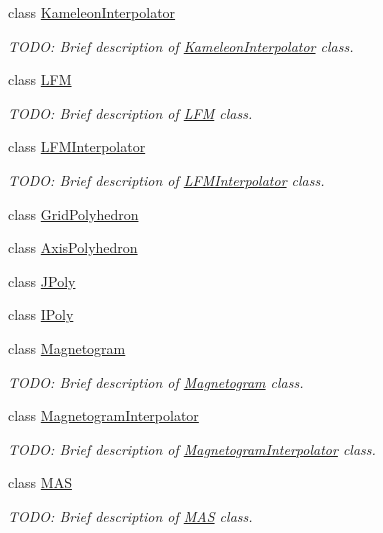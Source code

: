\begin{DoxyCompactItemize}
class \hyperlink{classccmc_1_1_kameleon_interpolator}{Kameleon\-Interpolator}
\begin{DoxyCompactList}\small\item\em T\-O\-D\-O\-: Brief description of \hyperlink{classccmc_1_1_kameleon_interpolator}{Kameleon\-Interpolator} class. \end{DoxyCompactList}\item 
class \hyperlink{classccmc_1_1_l_f_m}{L\-F\-M}
\begin{DoxyCompactList}\small\item\em T\-O\-D\-O\-: Brief description of \hyperlink{classccmc_1_1_l_f_m}{L\-F\-M} class. \end{DoxyCompactList}\item 
class \hyperlink{classccmc_1_1_l_f_m_interpolator}{L\-F\-M\-Interpolator}
\begin{DoxyCompactList}\small\item\em T\-O\-D\-O\-: Brief description of \hyperlink{classccmc_1_1_l_f_m_interpolator}{L\-F\-M\-Interpolator} class. \end{DoxyCompactList}\item 
class \hyperlink{classccmc_1_1_grid_polyhedron}{Grid\-Polyhedron}
\item 
class \hyperlink{classccmc_1_1_axis_polyhedron}{Axis\-Polyhedron}
\item 
class \hyperlink{classccmc_1_1_j_poly}{J\-Poly}
\item 
class \hyperlink{classccmc_1_1_i_poly}{I\-Poly}
\item 
class \hyperlink{classccmc_1_1_magnetogram}{Magnetogram}
\begin{DoxyCompactList}\small\item\em T\-O\-D\-O\-: Brief description of \hyperlink{classccmc_1_1_magnetogram}{Magnetogram} class. \end{DoxyCompactList}\item 
class \hyperlink{classccmc_1_1_magnetogram_interpolator}{Magnetogram\-Interpolator}
\begin{DoxyCompactList}\small\item\em T\-O\-D\-O\-: Brief description of \hyperlink{classccmc_1_1_magnetogram_interpolator}{Magnetogram\-Interpolator} class. \end{DoxyCompactList}\item 
class \hyperlink{classccmc_1_1_m_a_s}{M\-A\-S}
\begin{DoxyCompactList}\small\item\em T\-O\-D\-O\-: Brief description of \hyperlink{classccmc_1_1_m_a_s}{M\-A\-S} class. \end{DoxyCompactList}\item 

\end{DoxyCompactItemize}
